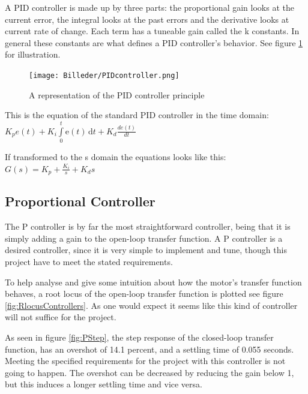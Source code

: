 A PID controller is made up by three parts: the proportional gain looks at the current error, the integral looks at the past errors and the derivative looks at current rate of change. Each term has a tuneable gain called the k constants. In general these constants are what defines a PID controller’s behavior. See figure \ref{fig:PID controller} for illustration. 

\begin{figure}[h!]
\centering
\texttt{[image: Billeder/PIDcontroller.png]}
\caption{ A representation of the PID controller principle }
\label{fig:PID controller}
\end{figure}

This is the equation of the standard PID controller in the time domain:\\$K_{p}e(t)+K_{i} \int\limits_0^t \mathrm{e}(t)\,\mathrm{d}t+K_{d}\frac{de(t)}{dt}$

If transformed to the s domain the equations looks like this:\\
$G(s)=K_{p}+\frac{K_{i}}{s}+K_{d}s$

\subsection{Proportional Controller}

The P controller is by far the most straightforward controller, being that it is simply adding a gain to the open-loop transfer function. A P controller is a desired controller, since it is very simple to implement and tune, though this project have to meet the stated requirements.\par

To help analyse and give some intuition about how the motor’s transfer function behaves, a root locus of the open-loop transfer function is plotted see figure \ref{fig:RlocusControllers}. As one would expect it seems like this kind of controller will not suffice for the project.\par

As seen in figure \ref{fig:PStep}, the step response of the closed-loop transfer function, has an overshot of 14.1 percent, and a settling time of 0.055 seconds. Meeting the specified requirements  for the project with this controller is not going to happen. The overshot can be decreased by reducing the gain below 1, but this induces a longer settling time and vice versa. 

